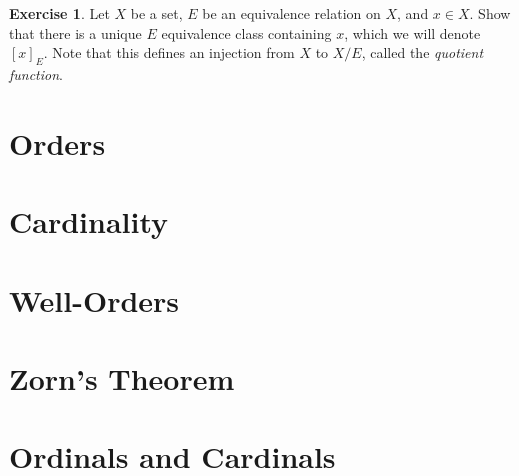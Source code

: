 \documentclass[letterpaper]{article}
\theoremstyle{definition}
\newtheorem{exercise}[theorem]{Exercise}
\newcommand{\defterm}{\emph}
\begin{document}
\begin{exercise}
  Let \(X\) be a set, \(E\) be an equivalence relation on \(X\), and
  \(x \in X\).  Show that there is a unique \(E\) equivalence class
  containing \(x\), which we will denote \([x]_E\).  Note that this
  defines an injection from \(X\) to \(X/E\), called the
  \defterm{quotient function}.
\end{exercise}

\section{Orders}

\section{Cardinality}

\section{Well-Orders}

\section{Zorn's Theorem}

\section{Ordinals and Cardinals}
\end{document}
